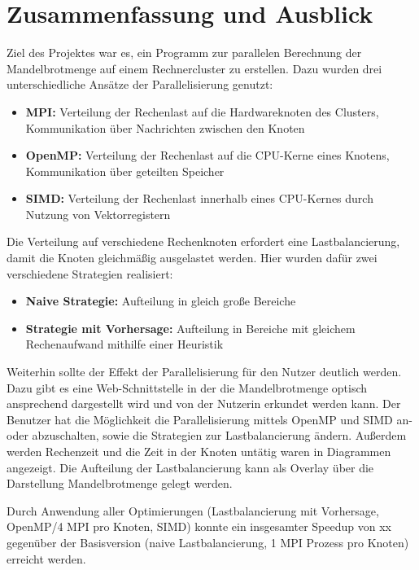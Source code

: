 \section{Zusammenfassung und Ausblick}


Ziel des Projektes war es, ein Programm zur parallelen Berechnung der Mandelbrotmenge auf einem Rechnercluster zu erstellen.
Dazu wurden drei unterschiedliche Ansätze der Parallelisierung genutzt:
\begin{itemize}
	\item \textbf{MPI:} Verteilung der Rechenlast auf die Hardwareknoten des Clusters, Kommunikation über Nachrichten zwischen den Knoten
	\item \textbf{OpenMP:} Verteilung der Rechenlast auf die CPU-Kerne eines Knotens, Kommunikation über geteilten Speicher
	\item \textbf{SIMD:} Verteilung der Rechenlast innerhalb eines CPU-Kernes durch Nutzung von Vektorregistern
\end{itemize}

Die Verteilung auf verschiedene Rechenknoten erfordert eine Lastbalancierung, damit die Knoten gleichmäßig ausgelastet werden.
Hier wurden dafür zwei verschiedene Strategien realisiert:
\begin{itemize}
	\item \textbf{Naive Strategie:} Aufteilung in gleich große Bereiche
	\item \textbf{Strategie mit Vorhersage:} Aufteilung in Bereiche mit gleichem Rechenaufwand mithilfe einer Heuristik
\end{itemize}

Weiterhin sollte der Effekt der Parallelisierung für den Nutzer deutlich werden.
Dazu gibt es eine Web-Schnittstelle in der die Mandelbrotmenge optisch ansprechend dargestellt wird und von der Nutzerin erkundet werden kann.
Der Benutzer hat die Möglichkeit die Parallelisierung mittels OpenMP und SIMD an- oder abzuschalten, sowie die Strategien zur Lastbalancierung ändern.
Außerdem werden Rechenzeit und die Zeit in der Knoten untätig waren in Diagrammen angezeigt.
Die Aufteilung der Lastbalancierung kann als Overlay über die Darstellung Mandelbrotmenge gelegt werden.

Durch Anwendung aller Optimierungen (Lastbalancierung mit Vorhersage, OpenMP/4 MPI pro Knoten, SIMD) konnte ein insgesamter Speedup von xx gegenüber der Basisversion (naive Lastbalancierung, 1 MPI Prozess pro Knoten) erreicht werden.

